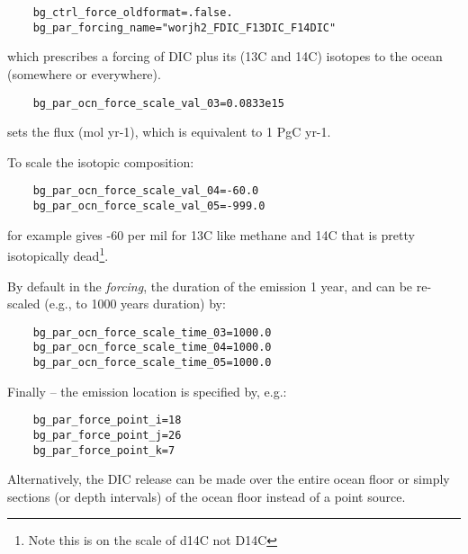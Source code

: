 \documentclass[10pt,twoside]{article}
\begin{document}
\begin{compactitem}

	\item
	\vspace{-5pt}\begin{verbatim}
	bg_ctrl_force_oldformat=.false.
	bg_par_forcing_name="worjh2_FDIC_F13DIC_F14DIC"
	\end{verbatim}\vspace{-5pt}
	which prescribes a forcing of DIC plus its (13C and 14C) isotopes to the ocean (somewhere or everywhere).
	\item
	\vspace{-5pt}\begin{verbatim}
	bg_par_ocn_force_scale_val_03=0.0833e15
	\end{verbatim}\vspace{-5pt}
	sets the flux (mol yr-1), which is equivalent to 1 PgC yr-1.
	\item To scale the isotopic composition:
	\vspace{-5pt}\begin{verbatim}
	bg_par_ocn_force_scale_val_04=-60.0
	bg_par_ocn_force_scale_val_05=-999.0
	\end{verbatim}\vspace{-5pt}
	for example gives -60 per mil for 13C like methane and 14C that is pretty isotopically dead\footnote{Note this is on the scale of d14C not D14C}.
	\item By default in the \textit{forcing}, the duration of the emission 1 year, and can be re-scaled (e.g., to 1000 years duration) by: 
	\vspace{-5pt}\begin{verbatim}
	bg_par_ocn_force_scale_time_03=1000.0
	bg_par_ocn_force_scale_time_04=1000.0
	bg_par_ocn_force_scale_time_05=1000.0
	\end{verbatim}\vspace{-5pt}
	\item Finally -- the emission location is specified by, e.g.:
	\vspace{-5pt}\begin{verbatim}
	bg_par_force_point_i=18
	bg_par_force_point_j=26
	bg_par_force_point_k=7
	\end{verbatim}\vspace{-5pt}
	Alternatively, the DIC release can be made over the entire ocean floor or simply sections (or depth intervals) of 
the ocean floor instead of a point source.

\end{compactitem}
\end{document}
